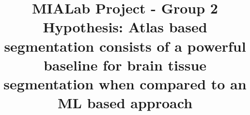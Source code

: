 \documentclass[conference]{IEEEtran}
\begin{document}
\title{MIALab Project - Group 2\\
{\footnotesize Hypothesis: Atlas based segmentation consists of a powerful baseline for brain tissue segmentation when compared to an ML based approach}
}

\author{
\and
{}
\and
{}
}

\maketitle

\begin{abstract}

\end{abstract}


% 






\end{document}

